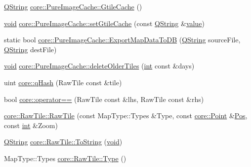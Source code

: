 \begin{DoxyCompactItemize}
\item 
\hyperlink{group___u_a_v_objects_plugin_gab9d252f49c333c94a72f97ce3105a32d}{Q\-String} \hyperlink{group___o_p_map_widget_ga30cc962d96388e3769ca3807c35d84ed}{core\-::\-Pure\-Image\-Cache\-::\-Gtile\-Cache} ()
\item 
\hyperlink{group___u_a_v_objects_plugin_ga444cf2ff3f0ecbe028adce838d373f5c}{void} \hyperlink{group___o_p_map_widget_gaf4e3245a367b45b888ca368f03ae9300}{core\-::\-Pure\-Image\-Cache\-::set\-Gtile\-Cache} (const \hyperlink{group___u_a_v_objects_plugin_gab9d252f49c333c94a72f97ce3105a32d}{Q\-String} \&\hyperlink{glext_8h_aa0e2e9cea7f208d28acda0480144beb0}{value})
\item 
static bool \hyperlink{group___o_p_map_widget_ga4cd3a5c37b5805594bf922e266312836}{core\-::\-Pure\-Image\-Cache\-::\-Export\-Map\-Data\-To\-D\-B} (\hyperlink{group___u_a_v_objects_plugin_gab9d252f49c333c94a72f97ce3105a32d}{Q\-String} source\-File, \hyperlink{group___u_a_v_objects_plugin_gab9d252f49c333c94a72f97ce3105a32d}{Q\-String} dest\-File)
\item 
\hyperlink{group___u_a_v_objects_plugin_ga444cf2ff3f0ecbe028adce838d373f5c}{void} \hyperlink{group___o_p_map_widget_ga1ae13fc8322336ab8de6f1c6ad09793c}{core\-::\-Pure\-Image\-Cache\-::delete\-Older\-Tiles} (\hyperlink{ioapi_8h_a787fa3cf048117ba7123753c1e74fcd6}{int} const \&days)
\item 
uint \hyperlink{group___o_p_map_widget_ga45a81278b07bda2f00748b2eb7f10e01}{core\-::q\-Hash} (Raw\-Tile const \&tile)
\item 
bool \hyperlink{group___o_p_map_widget_ga17ed512ed98b14303d6db91fc1624c5e}{core\-::operator==} (Raw\-Tile const \&lhs, Raw\-Tile const \&rhs)
\item 
\hyperlink{group___o_p_map_widget_ga6ea25b848193120014a2b04afbdf8913}{core\-::\-Raw\-Tile\-::\-Raw\-Tile} (const Map\-Type\-::\-Types \&Type, const \hyperlink{structcore_1_1_point}{core\-::\-Point} \&\hyperlink{deflate_8h_a80a8610ae675eaeead82013bacde10a1}{Pos}, const \hyperlink{ioapi_8h_a787fa3cf048117ba7123753c1e74fcd6}{int} \&Zoom)
\item 
\hyperlink{group___u_a_v_objects_plugin_gab9d252f49c333c94a72f97ce3105a32d}{Q\-String} \hyperlink{group___o_p_map_widget_gaf820aab5311f0f43e2e64399dcb65ef7}{core\-::\-Raw\-Tile\-::\-To\-String} (\hyperlink{group___u_a_v_objects_plugin_ga444cf2ff3f0ecbe028adce838d373f5c}{void})
\item 
Map\-Type\-::\-Types \hyperlink{group___o_p_map_widget_gab7a1ec0019fc105d9691bb2f0465f6b1}{core\-::\-Raw\-Tile\-::\-Type} ()

\end{DoxyCompactItemize}
